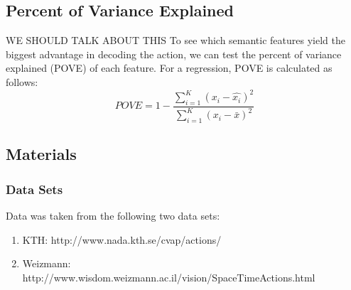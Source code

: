\documentclass{article}
\begin{document}
\subsection{Percent of Variance Explained}
WE SHOULD TALK ABOUT THIS
To see which semantic features yield the biggest advantage in decoding the action, we can test the percent of variance explained (POVE) of each feature. For a regression, POVE is calculated as follows:
\begin{equation}
POVE = 1 - \frac{\sum_{i = 1}^{K}(x_i - \hat{x_i})^2}{\sum_{i = 1}^{K}(x_i - \bar{x})^2}
\end{equation}
%
\subsection{Materials}
\subsubsection{Data Sets}
Data was taken from the following two data sets:
\begin{enumerate}
\item KTH: http://www.nada.kth.se/cvap/actions/
\item Weizmann: http://www.wisdom.weizmann.ac.il/\texttildelow vision/SpaceTimeActions.html
\end{enumerate}
\end{document}
